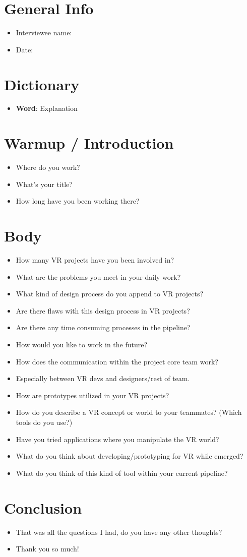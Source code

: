 \section{General Info}
{\renewcommand\labelitemi{}
\begin{itemize}
  \item Interviewee name:
  \item Date:
\end{itemize}
\section{Dictionary}
\begin{itemize}
  \item \textbf{Word}: Explanation
\end{itemize}

\section{Warmup / Introduction}
\begin{itemize}
\item
Where do you work?
\item
What's your title?
\item
How long have you been working there?

\end{itemize}
\section{Body}
\begin{itemize}
\item
How many VR projects have you been involved in?
\item
What are the problems you meet in your daily work?
\item
What kind of design process do you append to VR projects?
\item
Are there flaws with this design process in VR projects?
\item
Are there any time consuming processes in the pipeline?
\item
How would you like to work in the future?
\item
How does the communication within the project core team work?
\item
Especially between VR devs and designers/rest of team.
\item
How are prototypes utilized in your VR projects?
\item
How do you describe a VR concept or world to your teammates? (Which tools do you use?)
\item
Have you tried applications where you manipulate the VR world?
\item
What do you think about developing/prototyping for VR while emerged?
\item
What do you think of this kind of tool within your current pipeline?
\end{itemize}
\section{Conclusion}
\begin{itemize}
  \item
That was all the questions I had, do you have any other thoughts?
\item
Thank you so much!
\end{itemize}
}
